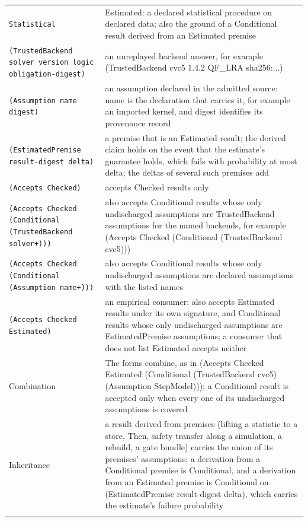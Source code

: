 \documentclass[11pt]{article}
\newcommand{\code}[1]{\texttt{#1}}
\theoremstyle{definition}
\theoremstyle{plain}
\begin{document}
{\begin{longtable}{>{\raggedright\arraybackslash}p{5.4cm}>{\raggedright\arraybackslash}p{9.0cm}}
\code{Statistical} & Estimated: a declared statistical procedure on declared data; also the ground of a Conditional result derived from an Estimated premise\\ \addlinespace[3pt]
\code{(TrustedBackend solver version logic obligation-digest)} & an unreplayed backend answer,\allowbreak{} for example (TrustedBackend cvc5 1.4.2 QF\_LRA sha256:...)\\ \addlinespace[3pt]
\code{(Assumption name digest)} & an assumption declared in the admitted source: name is the declaration that carries it,\allowbreak{} for example an imported kernel,\allowbreak{} and digest identifies its provenance record\\ \addlinespace[3pt]
\code{(EstimatedPremise result-digest delta)} & a premise that is an Estimated result; the derived claim holds on the event that the estimate's guarantee holds,\allowbreak{} which fails with probability at most delta; the deltas of several such premises add\\ \addlinespace[3pt]
\code{(Accepts Checked)} & accepts Checked results only\\ \addlinespace[3pt]
\code{(Accepts Checked (Conditional (TrustedBackend solver+)))} & also accepts Conditional results whose only undischarged assumptions are TrustedBackend assumptions for the named backends,\allowbreak{} for example (Accepts Checked (Conditional (TrustedBackend cvc5)))\\ \addlinespace[3pt]
\code{(Accepts Checked (Conditional (Assumption name+)))} & also accepts Conditional results whose only undischarged assumptions are declared assumptions with the listed names\\ \addlinespace[3pt]
\code{(Accepts Checked Estimated)} & an empirical consumer: also accepts Estimated results under its own signature,\allowbreak{} and Conditional results whose only undischarged assumptions are EstimatedPremise assumptions; a consumer that does not list Estimated accepts neither\\ \addlinespace[3pt]
Combination & The forms combine,\allowbreak{} as in (Accepts Checked Estimated (Conditional (TrustedBackend cvc5) (Assumption StepModel))); a Conditional result is accepted only when every one of its undischarged assumptions is covered\\ \addlinespace[3pt]
Inheritance & a result derived from premises (lifting a statistic to a store,\allowbreak{} Then,\allowbreak{} safety transfer along a simulation,\allowbreak{} a rebuild,\allowbreak{} a gate bundle) carries the union of its premises' assumptions; a derivation from a Conditional premise is Conditional,\allowbreak{} and a derivation from an Estimated premise is Conditional on (EstimatedPremise result-digest delta),\allowbreak{} which carries the estimate's failure probability\\ \addlinespace[3pt]

\end{longtable}}
\end{document}
